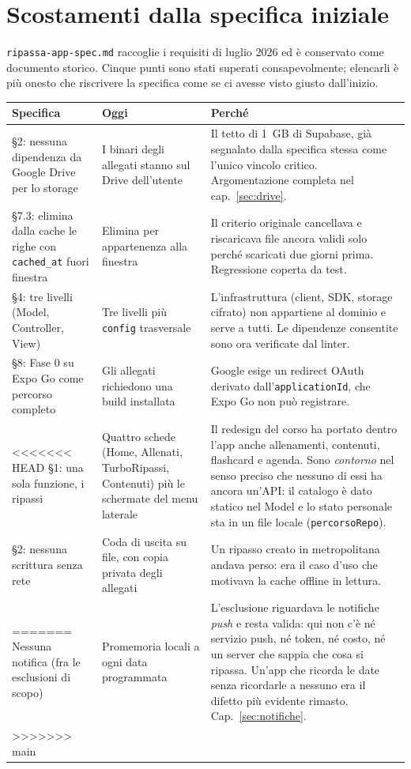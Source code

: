 \documentclass[11pt,a4paper]{report}
\begin{document}
\chapter{Scostamenti dalla specifica iniziale}

\texttt{ripassa-app-spec.md} raccoglie i requisiti di luglio 2026 ed \`e
conservato come documento storico. Cinque punti sono stati superati
consapevolmente; elencarli \`e pi\`u onesto che riscrivere la specifica come
se ci avesse visto giusto dall'inizio.

\begin{center}
\small
\begin{tabular}{@{}p{3.5cm}p{5.2cm}p{5.9cm}@{}}
\toprule
\textbf{Specifica} & \textbf{Oggi} & \textbf{Perch\'e} \\
\midrule
\S2: nessuna dipendenza da Google Drive per lo storage &
  I binari degli allegati stanno sul Drive dell'utente &
  Il tetto di 1~GB di Supabase, gi\`a segnalato dalla specifica stessa come
  l'unico vincolo critico. Argomentazione completa nel cap.~\ref{sec:drive}. \\
\addlinespace
\S7.3: elimina dalla cache le righe con \texttt{cached\_at} fuori finestra &
  Elimina per appartenenza alla finestra &
  Il criterio originale cancellava e riscaricava file ancora validi solo
  perch\'e scaricati due giorni prima. Regressione coperta da test. \\
\addlinespace
\S4: tre livelli (Model, Controller, View) &
  Tre livelli pi\`u \texttt{config} trasversale &
  L'infrastruttura (client, SDK, storage cifrato) non appartiene al dominio e
  serve a tutti. Le dipendenze consentite sono ora verificate dal linter. \\
\addlinespace
\S8: Fase 0 su Expo Go come percorso completo &
  Gli allegati richiedono una build installata &
  Google esige un redirect OAuth derivato dall'\texttt{applicationId}, che
  Expo Go non pu\`o registrare. \\
\addlinespace
<<<<<<< HEAD
\S1: una sola funzione, i ripassi &
  Quattro schede (Home, Allenati, TurboRipassi, Contenuti) pi\`u le schermate
  del menu laterale &
  Il redesign del corso ha portato dentro l'app anche allenamenti, contenuti,
  flashcard e agenda. Sono \emph{contorno} nel senso preciso che nessuno di
  essi ha ancora un'API: il catalogo \`e dato statico nel Model e lo stato
  personale sta in un file locale (\texttt{percorsoRepo}). \\
\addlinespace
\S2: nessuna scrittura senza rete &
  Coda di uscita su file, con copia privata degli allegati &
  Un ripasso creato in metropolitana andava perso: era il caso d'uso che
  motivava la cache offline in lettura. \\
=======
Nessuna notifica (fra le esclusioni di scopo) &
  Promemoria locali a ogni data programmata &
  L'esclusione riguardava le notifiche \emph{push} e resta valida: qui non c'\`e
  n\'e servizio push, n\'e token, n\'e costo, n\'e un server che sappia che cosa
  si ripassa. Un'app che ricorda le date senza ricordarle a nessuno era il
  difetto pi\`u evidente rimasto. Cap.~\ref{sec:notifiche}. \\
>>>>>>> main
\bottomrule
\end{tabular}
\end{center}
\end{document}
